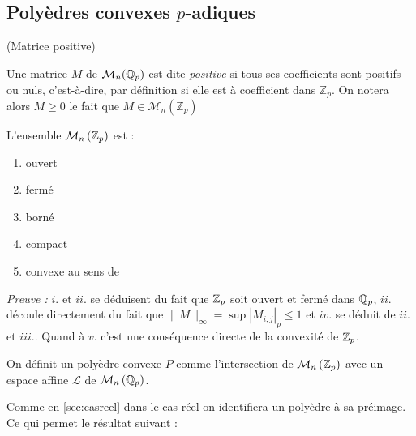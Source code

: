 \fi


\subsection{Polyèdres convexes \texorpdfstring{$p$}{p}-adiques} 

\begin{definition}
	(Matrice positive)


	Une matrice $M$ de $\mathcal{M}_n(\mathbb{Q}_p)$ est dite \emph{positive} si tous ses coefficients sont positifs ou nuls, c'est-à-dire, par définition si elle est à coefficient dans $\mathbb{Z}_p$.
	On notera alors $M\ge 0$ le fait que $M \in \mathcal{M}_{n}\left(\mathbb{Z}_p\right) $

\end{definition}

\begin{propriete}
	L'ensemble $\mathcal{M}_n \left(  \mathbb {Z}_p  \right)$ est :
	\begin{enumerate}[label=\roman*.]
	\item ouvert
	\item fermé
	\item borné
	\item compact
	\item convexe au sens de \parencite{monna_ensembles_1958}
\end{enumerate}
\end{propriete}
\textit{Preuve :}
$i.$ et $ii.$ se déduisent du fait que $ \mathbb {Z}_p $ soit ouvert et fermé dans $\mathbb{Q}_p$, $ii.$ découle directement du fait que $\|M\|_\infty = \sup |M_{i,j}|_p \le 1$ et $iv.$ se déduit de $ii.$ et $iii.$.
Quand à $v.$ c'est une conséquence directe de la convexité de $ \mathbb {Z}_p $.

\begin{definition}
	
On définit un polyèdre convexe $P$ comme l'intersection de $\mathcal{M}_n \left(  \mathbb {Z}_p  \right)$ avec un espace affine $\mathcal{L} $ de $\mathcal{M}_n\left( \mathbb{Q}_p \right) $. 
\end{definition}
Comme en \ref{sec:casreel} dans le cas réel on identifiera un polyèdre à sa préimage. Ce qui permet le résultat suivant :



